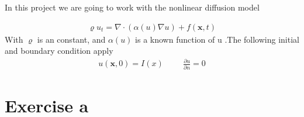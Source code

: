 \documentclass[a4paper,norsk]{article}
\begin{document}
\maketitle
In this project we are going to work with the nonlinear diffusion model

\begin{align}
\varrho u_t = \nabla \cdot (\alpha(u) \nabla u) + f(\textbf{x},t)
\end{align}
With $\varrho$ is an constant, and $\alpha(u)$ is a known function of u
.The following initial and boundary condition apply
\begin{align}
u(\textbf{x},0) = I(x) \hspace{1cm} \frac{\partial u}{\partial n} = 0
\end{align}

\section*{Exercise a}
\end{document}
